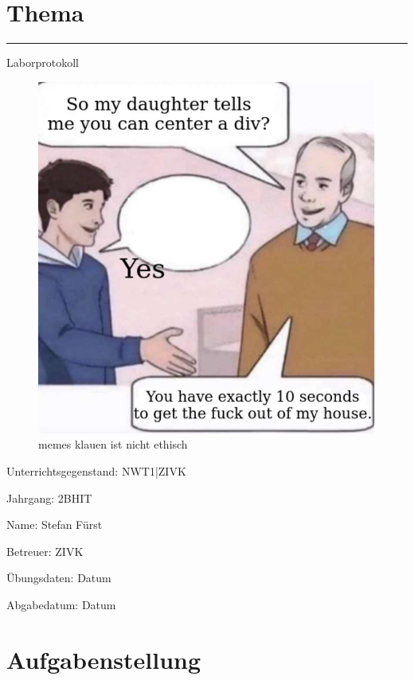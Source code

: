 \documentclass[a4paper]{article}
\begin{document}
\pagestyle{oida}
\section*{Thema}
\par\noindent\rule{\textwidth}{0.4pt}

Laborprotokoll

\begin{figure}[h]
\includegraphics[scale=0.6]{meme.jpeg}
\caption{memes klauen ist nicht ethisch}
\end{figure}

\vspace*{\fill}
Unterrichtsgegenstand:	NWT1|ZIVK

Jahrgang:	2BHIT

Name:	Stefan Fürst

Betreuer: 	ZIVK

Übungsdaten:	Datum

Abgabedatum:	Datum


\newpage
\tableofcontents

\newpage

\section{Aufgabenstellung}
\end{document}

